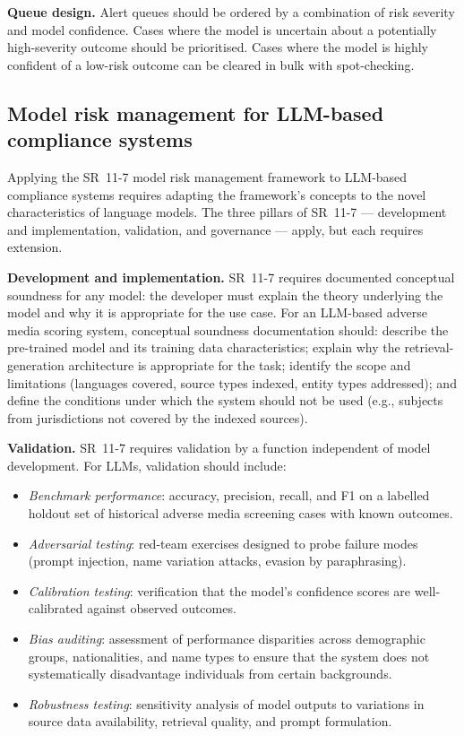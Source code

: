 \textbf{Queue design.} Alert queues should be ordered by a combination of risk severity and model confidence. Cases where the model is uncertain about a potentially high-severity outcome should be prioritised. Cases where the model is highly confident of a low-risk outcome can be cleared in bulk with spot-checking.

\subsection{Model risk management for LLM-based compliance systems}
\label{sec:ch11-model-risk-management}

Applying the SR~11-7 model risk management framework to LLM-based compliance systems requires adapting the framework's concepts to the novel characteristics of language models. The three pillars of SR~11-7 --- development and implementation, validation, and governance --- apply, but each requires extension.

\textbf{Development and implementation.} SR~11-7 requires documented conceptual soundness for any model: the developer must explain the theory underlying the model and why it is appropriate for the use case. For an LLM-based adverse media scoring system, conceptual soundness documentation should: describe the pre-trained model and its training data characteristics; explain why the retrieval-generation architecture is appropriate for the task; identify the scope and limitations (languages covered, source types indexed, entity types addressed); and define the conditions under which the system should not be used (e.g., subjects from jurisdictions not covered by the indexed sources).

\textbf{Validation.} SR~11-7 requires validation by a function independent of model development. For LLMs, validation should include:
\begin{itemize}
  \item \emph{Benchmark performance}: accuracy, precision, recall, and F1 on a labelled holdout set of historical adverse media screening cases with known outcomes.
  \item \emph{Adversarial testing}: red-team exercises designed to probe failure modes (prompt injection, name variation attacks, evasion by paraphrasing).
  \item \emph{Calibration testing}: verification that the model's confidence scores are well-calibrated against observed outcomes.
  \item \emph{Bias auditing}: assessment of performance disparities across demographic groups, nationalities, and name types to ensure that the system does not systematically disadvantage individuals from certain backgrounds.
  \item \emph{Robustness testing}: sensitivity analysis of model outputs to variations in source data availability, retrieval quality, and prompt formulation.
\end{itemize}

